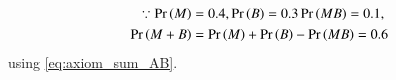 	\begin{align}
\because\pr{M} &= 0.4, \pr{B} =0.3 \pr{MB} = 0.1,\\
\pr{M+B} &= \pr{M}+\pr{B}-\pr{MB}
	  =0.6
\end{align}
using 
\eqref{eq:axiom_sum_AB}.
